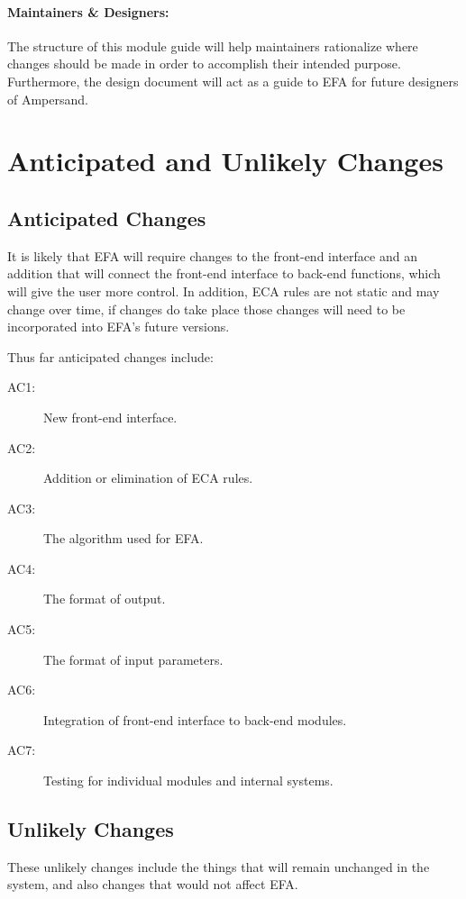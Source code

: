 \documentclass[12pt, svgnames]{article}
\begin{document}
\paragraph{Maintainers \& Designers:} The structure of this module guide will 
help maintainers rationalize where changes should be made in order to 
accomplish their intended purpose. Furthermore, the design document will act as 
a guide to EFA for future designers of Ampersand.

\section{Anticipated and Unlikely Changes}
\subsection{Anticipated Changes}
It is likely that EFA will require changes to the front-end interface and an 
addition that will connect the front-end interface to back-end functions, which 
will give the user more control. In addition, ECA rules are not static and may 
change over time, if changes do take place those changes will need to be 
incorporated into EFA's future versions. 

Thus far anticipated changes include:

\begin{description}
    \item[AC1:] New front-end interface.
    \item[AC2:] Addition or elimination of ECA rules.
    \item[AC3:] The algorithm used for EFA.
    \item[AC4:] The format of output.
    \item[AC5:] The format of input parameters.
    \item[AC6:] Integration of front-end interface to back-end modules.
    \item[AC7:] Testing for individual modules and internal systems.
    
\end{description}

\subsection{Unlikely Changes} 

These unlikely changes include the things that will remain unchanged in the 
system, and also changes that would not affect EFA. 
\end{document}
